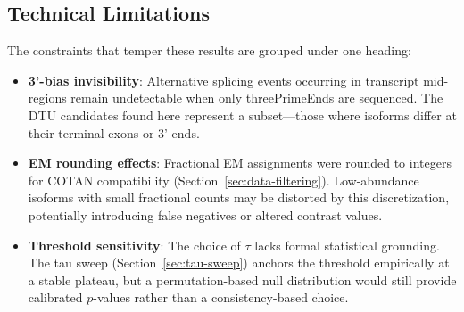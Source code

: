 \subsection*{Technical Limitations}

The constraints that temper these results are grouped under one heading:
\begin{itemize}
    \item \textbf{3'-bias invisibility}: Alternative splicing events occurring in transcript mid-regions remain undetectable when only \gls{threePrimeEnd}s are sequenced. The DTU candidates found here represent a subset---those where isoforms differ at their terminal exons or 3' ends.

    \item \textbf{EM rounding effects}: Fractional EM assignments were rounded to integers for COTAN compatibility (Section~\ref{sec:data-filtering}). Low-abundance isoforms with small fractional counts may be distorted by this discretization, potentially introducing false negatives or altered contrast values.

    \item \textbf{Threshold sensitivity}: The choice of $\tau$ lacks formal statistical grounding. The tau sweep (Section~\ref{sec:tau-sweep}) anchors the threshold empirically at a stable plateau, but a permutation-based null distribution would still provide calibrated $p$-values rather than a consistency-based choice.
\end{itemize}
